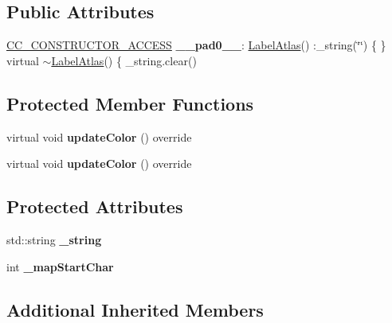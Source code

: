\subsection*{Public Attributes}
\begin{DoxyCompactItemize}
\item 
\mbox{\label{classLabelAtlas_af7b8411b243b687133338ba12d2ed711}} 
\hyperlink{_2cocos2d_2cocos_2base_2ccConfig_8h_a25ef1314f97c35a2ed3d029b0ead6da0}{C\+C\+\_\+\+C\+O\+N\+S\+T\+R\+U\+C\+T\+O\+R\+\_\+\+A\+C\+C\+E\+SS} {\bfseries \+\_\+\+\_\+pad0\+\_\+\+\_\+}\+: \hyperlink{classLabelAtlas}{Label\+Atlas}() \+:\+\_\+string(\char`\"{}\char`\"{}) \{ \} virtual $\sim$\hyperlink{classLabelAtlas}{Label\+Atlas}() \{ \+\_\+string.\+clear()
\end{DoxyCompactItemize}
\subsection*{Protected Member Functions}
\begin{DoxyCompactItemize}
\item 
\mbox{\label{classLabelAtlas_a68aa1be1c16486abe9fc94eddb49d03d}} 
virtual void {\bfseries update\+Color} () override
\item 
\mbox{\label{classLabelAtlas_a9aaeccb1253a08c4b3a43ce716b5fb16}} 
virtual void {\bfseries update\+Color} () override
\end{DoxyCompactItemize}
\subsection*{Protected Attributes}
\begin{DoxyCompactItemize}
\item 
\mbox{\label{classLabelAtlas_a8bd35affc164a177edda8a09a40612c2}} 
std\+::string {\bfseries \+\_\+string}
\item 
\mbox{\label{classLabelAtlas_a64e03d78b243ab0b40f8eb5e0786c3cb}} 
int {\bfseries \+\_\+map\+Start\+Char}
\end{DoxyCompactItemize}
\subsection*{Additional Inherited Members}


